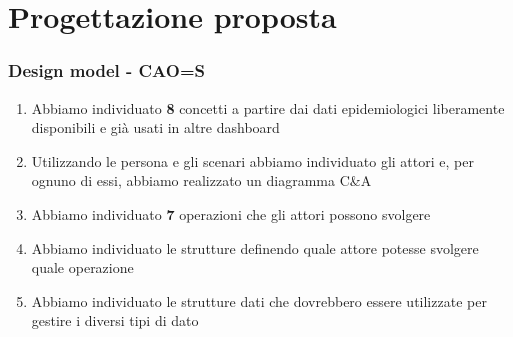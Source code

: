\documentclass[handout]{beamer}
\begin{document}
	\section{Progettazione proposta}
		\begin{frame}
			\frametitle{Design model - CAO=S}
			\begin{enumerate}[<+->]
				\item Abbiamo individuato \textbf{8} concetti a partire dai dati epidemiologici liberamente disponibili e già usati in altre dashboard\\
				\item Utilizzando le persona e gli scenari abbiamo individuato gli attori e, per ognuno di essi, abbiamo realizzato un diagramma C\&A\\
				\item Abbiamo individuato \textbf{7} operazioni che gli attori possono svolgere\\
				\item Abbiamo individuato le strutture definendo quale attore potesse svolgere quale operazione\\
				\item Abbiamo individuato le strutture dati che dovrebbero essere utilizzate per gestire i diversi tipi di dato\\
			\end{enumerate}
		\end{frame}
\end{document}
